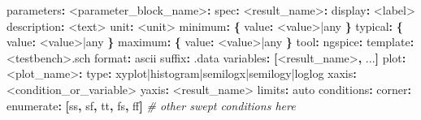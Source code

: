 \documentclass[
]{article}
\newenvironment{Shaded}{}{}
\newcommand{\AttributeTok}[1]{\textcolor[rgb]{0.49,0.56,0.16}{#1}}
\newcommand{\CommentTok}[1]{\textcolor[rgb]{0.38,0.63,0.69}{\textit{#1}}}
\newcommand{\FunctionTok}[1]{\textcolor[rgb]{0.02,0.16,0.49}{#1}}
\newcommand{\KeywordTok}[1]{\textcolor[rgb]{0.00,0.44,0.13}{\textbf{#1}}}
\begin{document}
\begin{Shaded}
\begin{Highlighting}[]
\FunctionTok{parameters}\KeywordTok{:}
\AttributeTok{  }\FunctionTok{\textless{}parameter\_block\_name\textgreater{}}\KeywordTok{:}
\AttributeTok{    }\FunctionTok{spec}\KeywordTok{:}
\AttributeTok{      }\FunctionTok{\textless{}result\_name\textgreater{}}\KeywordTok{:}
\AttributeTok{        }\FunctionTok{display}\KeywordTok{:}\AttributeTok{ \textless{}label\textgreater{}}
\AttributeTok{        }\FunctionTok{description}\KeywordTok{:}\AttributeTok{ \textless{}text\textgreater{}}
\AttributeTok{        }\FunctionTok{unit}\KeywordTok{:}\AttributeTok{ \textless{}unit\textgreater{}}
\AttributeTok{        }\FunctionTok{minimum}\KeywordTok{:}\AttributeTok{ }\KeywordTok{\{}\AttributeTok{ }\FunctionTok{value}\KeywordTok{:}\AttributeTok{ \textless{}value\textgreater{}|any }\KeywordTok{\}}
\AttributeTok{        }\FunctionTok{typical}\KeywordTok{:}\AttributeTok{  }\KeywordTok{\{}\AttributeTok{ }\FunctionTok{value}\KeywordTok{:}\AttributeTok{ \textless{}value\textgreater{}|any }\KeywordTok{\}}
\AttributeTok{        }\FunctionTok{maximum}\KeywordTok{:}\AttributeTok{ }\KeywordTok{\{}\AttributeTok{ }\FunctionTok{value}\KeywordTok{:}\AttributeTok{ \textless{}value\textgreater{}|any }\KeywordTok{\}}
\AttributeTok{    }\FunctionTok{tool}\KeywordTok{:}
\AttributeTok{      }\FunctionTok{ngspice}\KeywordTok{:}
\AttributeTok{        }\FunctionTok{template}\KeywordTok{:}\AttributeTok{ \textless{}testbench\textgreater{}.sch}
\AttributeTok{        }\FunctionTok{format}\KeywordTok{:}\AttributeTok{ ascii}
\AttributeTok{        }\FunctionTok{suffix}\KeywordTok{:}\AttributeTok{ .data}
\AttributeTok{        }\FunctionTok{variables}\KeywordTok{:}\AttributeTok{ }\KeywordTok{[}\AttributeTok{\textless{}result\_name\textgreater{}}\KeywordTok{,}\AttributeTok{ ...}\KeywordTok{]}
\AttributeTok{    }\FunctionTok{plot}\KeywordTok{:}
\AttributeTok{      }\FunctionTok{\textless{}plot\_name\textgreater{}}\KeywordTok{:}
\AttributeTok{        }\FunctionTok{type}\KeywordTok{:}\AttributeTok{ xyplot|histogram|semilogx|semilogy|loglog}
\AttributeTok{        }\FunctionTok{xaxis}\KeywordTok{:}\AttributeTok{ \textless{}condition\_or\_variable\textgreater{}}
\AttributeTok{        }\FunctionTok{yaxis}\KeywordTok{:}\AttributeTok{ \textless{}result\_name\textgreater{}}
\AttributeTok{        }\FunctionTok{limits}\KeywordTok{:}\AttributeTok{ auto}
\AttributeTok{    }\FunctionTok{conditions}\KeywordTok{:}
\AttributeTok{      }\FunctionTok{corner}\KeywordTok{:}
\AttributeTok{        }\FunctionTok{enumerate}\KeywordTok{:}\AttributeTok{ }\KeywordTok{[}\AttributeTok{ss}\KeywordTok{,}\AttributeTok{ sf}\KeywordTok{,}\AttributeTok{ tt}\KeywordTok{,}\AttributeTok{ fs}\KeywordTok{,}\AttributeTok{ ff}\KeywordTok{]}
\CommentTok{      \# other swept conditions here}
\end{Highlighting}
\end{Shaded}
\end{document}
